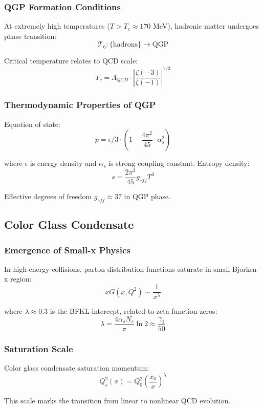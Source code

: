 \documentclass[11pt]{article}
\begin{document}
\subsubsection{QGP Formation Conditions}

At extremely high temperatures ($T > T_c \approx 170$ MeV), hadronic matter undergoes phase transition:
$$\mathcal{T}_6: \{\text{hadrons}\} \to \text{QGP}$$

Critical temperature relates to QCD scale:
$$T_c = \Lambda_{QCD} \cdot \left|\frac{\zeta(-3)}{\zeta(-1)}\right|^{1/3}$$

\subsubsection{Thermodynamic Properties of QGP}

Equation of state:
$$p = \epsilon/3 \cdot \left(1 - \frac{4\pi^2}{45} \cdot \alpha_s^2\right)$$

where $\epsilon$ is energy density and $\alpha_s$ is strong coupling constant. Entropy density:
$$s = \frac{2\pi^2}{45} g_{eff} T^3$$

Effective degrees of freedom $g_{eff} \approx 37$ in QGP phase.

\subsection{Color Glass Condensate}

\subsubsection{Emergence of Small-x Physics}

In high-energy collisions, parton distribution functions saturate in small Bjorken-x region:
$$xG(x, Q^2) \sim \frac{1}{x^{\lambda}}$$

where $\lambda \approx 0.3$ is the BFKL intercept, related to zeta function zeros:
$$\lambda = \frac{4\alpha_s N_c}{\pi} \ln 2 \approx \frac{\gamma_1}{50}$$

\subsubsection{Saturation Scale}

Color glass condensate saturation momentum:
$$Q_s^2(x) = Q_0^2 \left(\frac{x_0}{x}\right)^{\lambda}$$

This scale marks the transition from linear to nonlinear QCD evolution.
\end{document}
